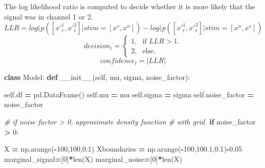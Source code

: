 \documentclass[12pt,twoside]{reedthesis}
\newenvironment{Shaded}{\begin{snugshade}}{\end{snugshade}}
\newcommand{\BuiltInTok}[1]{#1}
\newcommand{\CommentTok}[1]{\textcolor[rgb]{0.56,0.35,0.01}{\textit{#1}}}
\newcommand{\ControlFlowTok}[1]{\textcolor[rgb]{0.13,0.29,0.53}{\textbf{#1}}}
\newcommand{\DecValTok}[1]{\textcolor[rgb]{0.00,0.00,0.81}{#1}}
\newcommand{\FloatTok}[1]{\textcolor[rgb]{0.00,0.00,0.81}{#1}}
\newcommand{\FunctionTok}[1]{\textcolor[rgb]{0.00,0.00,0.00}{#1}}
\newcommand{\KeywordTok}[1]{\textcolor[rgb]{0.13,0.29,0.53}{\textbf{#1}}}
\newcommand{\NormalTok}[1]{#1}
\newcommand{\OperatorTok}[1]{\textcolor[rgb]{0.81,0.36,0.00}{\textbf{#1}}}
\newcommand{\VariableTok}[1]{\textcolor[rgb]{0.00,0.00,0.00}{#1}}
\begin{document}
The log likelihood ratio is computed to decide whether it is more likely that the signal was in channel 1 or 2.
\begin{equation}
LLR=log(p([x'^1_t,x'^2_t]|stim=[x^s,x^n])-log(p([x'^1_t,x'^2_t]|stim=[x^n,x^s])
\end{equation}
\begin{equation}
  decision_t=\begin{cases}
    \text{1}, & \text{if } LLR>1.\\
   \text{2}, & \text{else}.
    
  \end{cases}
\end{equation}
\begin{equation}
confidence_t = |LLR|
\end{equation}
\begin{Shaded}
\begin{Highlighting}[]
\KeywordTok{class}\NormalTok{ Model:}
    \KeywordTok{def} \FunctionTok{\_\_init\_\_}\NormalTok{(}\VariableTok{self}\NormalTok{, mu, sigma, noise\_factor):}
        
        \VariableTok{self}\NormalTok{.df }\OperatorTok{=}\NormalTok{ pd.DataFrame()}
        \VariableTok{self}\NormalTok{.mu }\OperatorTok{=}\NormalTok{ mu}
        \VariableTok{self}\NormalTok{.sigma }\OperatorTok{=}\NormalTok{ sigma}
        \VariableTok{self}\NormalTok{.noise\_factor }\OperatorTok{=}\NormalTok{ noise\_factor}
        
        \CommentTok{\# if noise factor \textgreater{} 0, approximate density function}
        \CommentTok{\# with grid.}
        \ControlFlowTok{if}\NormalTok{ noise\_factor }\OperatorTok{\textgreater{}} \DecValTok{0}\NormalTok{:}
        
\NormalTok{          X }\OperatorTok{=}\NormalTok{ np.arange(}\OperatorTok{{-}}\DecValTok{100}\NormalTok{,}\DecValTok{100}\NormalTok{,}\FloatTok{0.1}\NormalTok{)}
\NormalTok{          Xboundaries }\OperatorTok{=}\NormalTok{ np.arange(}\OperatorTok{{-}}\DecValTok{100}\NormalTok{,}\FloatTok{100.1}\NormalTok{,}\FloatTok{0.1}\NormalTok{)}\OperatorTok{{-}}\FloatTok{0.05}
\NormalTok{          marginal\_signal}\OperatorTok{=}\NormalTok{[}\DecValTok{0}\NormalTok{]}\OperatorTok{*}\BuiltInTok{len}\NormalTok{(X)}
\NormalTok{          marginal\_noise}\OperatorTok{=}\NormalTok{[}\DecValTok{0}\NormalTok{]}\OperatorTok{*}\BuiltInTok{len}\NormalTok{(X)}
          

\end{Highlighting}
\end{Shaded}
\end{document}

